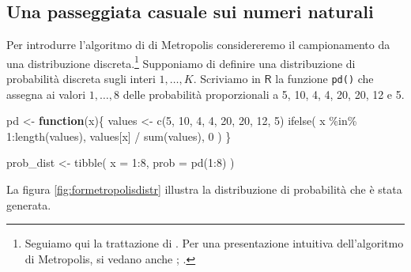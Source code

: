 \documentclass[
]{memoir}
\newenvironment{Shaded}{\begin{snugshade}}{\end{snugshade}}
\newcommand{\AttributeTok}[1]{\textcolor[rgb]{0.77,0.63,0.00}{#1}}
\newcommand{\ControlFlowTok}[1]{\textcolor[rgb]{0.13,0.29,0.53}{\textbf{#1}}}
\newcommand{\DecValTok}[1]{\textcolor[rgb]{0.00,0.00,0.81}{#1}}
\newcommand{\FunctionTok}[1]{\textcolor[rgb]{0.00,0.00,0.00}{#1}}
\newcommand{\NormalTok}[1]{#1}
\newcommand{\OtherTok}[1]{\textcolor[rgb]{0.56,0.35,0.01}{#1}}
\newcommand{\SpecialCharTok}[1]{\textcolor[rgb]{0.00,0.00,0.00}{#1}}
\newcommand{\R}{\textsf{R}} %
\begin{document}
\hypertarget{una-passeggiata-casuale-sui-numeri-naturali}{%
\subsection{Una passeggiata casuale sui numeri naturali}\label{una-passeggiata-casuale-sui-numeri-naturali}}

Per introdurre l'algoritmo di di Metropolis considereremo il campionamento da una distribuzione discreta.\footnote{Seguiamo qui la trattazione di \citet{albert2019probability}. Per una presentazione intuitiva dell'algoritmo di Metropolis, si vedano anche \citet{doing_bayesian_data_an}; \citet{McElreath_rethinking}.} Supponiamo di definire una distribuzione di probabilità discreta sugli interi \(1,\dots, K\). Scriviamo in \(\R\) la funzione \texttt{pd()} che assegna ai valori \(1,\dots, 8\) delle probabilità proporzionali a 5, 10, 4, 4, 20, 20, 12 e 5.

\begin{Shaded}
\begin{Highlighting}[]
\NormalTok{pd }\OtherTok{\textless{}{-}} \ControlFlowTok{function}\NormalTok{(x)\{}
\NormalTok{  values }\OtherTok{\textless{}{-}} \FunctionTok{c}\NormalTok{(}\DecValTok{5}\NormalTok{, }\DecValTok{10}\NormalTok{, }\DecValTok{4}\NormalTok{, }\DecValTok{4}\NormalTok{, }\DecValTok{20}\NormalTok{, }\DecValTok{20}\NormalTok{, }\DecValTok{12}\NormalTok{, }\DecValTok{5}\NormalTok{)}
  \FunctionTok{ifelse}\NormalTok{(}
\NormalTok{    x }\SpecialCharTok{\%in\%} \DecValTok{1}\SpecialCharTok{:}\FunctionTok{length}\NormalTok{(values),}
\NormalTok{    values[x] }\SpecialCharTok{/} \FunctionTok{sum}\NormalTok{(values),}
    \DecValTok{0}
\NormalTok{  )}
\NormalTok{\}}

\NormalTok{prob\_dist }\OtherTok{\textless{}{-}} \FunctionTok{tibble}\NormalTok{(}
  \AttributeTok{x =} \DecValTok{1}\SpecialCharTok{:}\DecValTok{8}\NormalTok{,}
  \AttributeTok{prob =} \FunctionTok{pd}\NormalTok{(}\DecValTok{1}\SpecialCharTok{:}\DecValTok{8}\NormalTok{)}
\NormalTok{)}
\end{Highlighting}
\end{Shaded}

\noindent
La figura \ref{fig:formetropolisdistr} illustra la distribuzione di probabilità che è stata generata.
\end{document}
